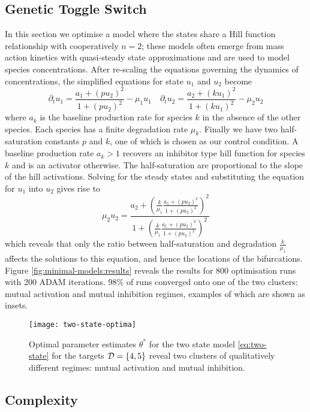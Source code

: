 \subsection{Genetic Toggle Switch}
In this section we optimise a model where the states share a Hill function relationship with cooperatively $n=2$; these models often emerge from mass action kinetics with quasi-steady state approximations and are used to model species concentrations. After re-scaling the equations governing the dynamics of concentrations, the simplified equations for state $u_1$ and $u_2$ become 
\begin{equation}
    \partial_t u_1 = \frac{ a_1 + (p u_2)^2}{ 1 + (p u_2)^2 } - \mu_1 u_1 \quad
    \partial_t u_2 = \frac{ a_2 + (k u_1)^2}{ 1 + (k u_1)^2 } - \mu_2 u_2
    \label{eq:two-state}
\end{equation}
where $a_k$ is the baseline production rate for species $k$ in the absence of the other species. Each species has a finite degradation rate $\mu_k$. Finally we have two half-saturation constants $p$ and $k$, one of which is chosen as our control condition. A baseline production rate $a_k>1$ recovers an inhibitor type hill function for species $k$ and is an activator otherwise. The half-saturation are proportional to the slope of the hill activations. Solving for the steady states and substituting the equation for $u_1$ into $u_2$ gives rise to
\begin{equation}
    \mu_2 u_2 = \frac{ a_2 + (\frac{k}{\mu_1}
    \frac{ a_1 + (p u_2)^2}{ 1 + (p u_2)^2 })^2}{ 1 + (\frac{k}{\mu_1} 
    \frac{ a_1 + (p u_2)^2}{ 1 + (p u_2)^2 }
    )^2 }
    \label{eq:steady-states}
\end{equation}
which reveals that only the ratio between half-saturation and degradation $\frac{k}{\mu_1}$ affects the solutions to this equation, and hence the locations of the bifurcations. Figure \ref{fig:minimal-models:results} reveals the results for 800 optimisation runs with 200 ADAM iterations. 98\% of runs converged onto one of the two clusters: mutual activation and mutual inhibition regimes, examples of which are shown as insets.
\begin{figure}
\centering
\texttt{[image: two-state-optima]}
\caption{Optimal parameter estimates $\theta^*$ for the two state model \eqref{eq:two-state} for the targets $\mathcal{D}=\{4,5\}$ reveal two clusters of qualitatively different regimes: mutual activation and mutual inhibition. }
\label{fig:two-state-optima}
\end{figure}
\subsection{Complexity}


